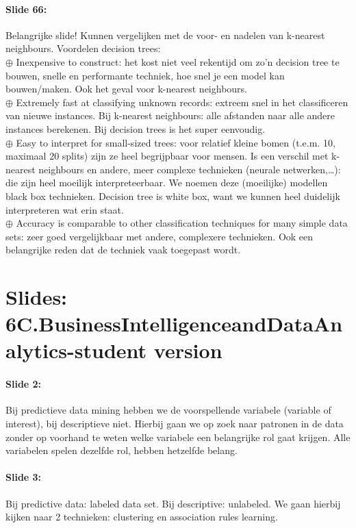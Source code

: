 \documentclass[10pt,a4paper]{report}
\begin{document}
\paragraph{Slide 66:}Belangrijke slide! Kunnen vergelijken met de voor- en nadelen van k-nearest neighbours. Voordelen decision trees:\\
$\oplus$ Inexpensive to construct: het kost niet veel rekentijd om zo'n decision tree te bouwen, snelle en performante techniek, hoe snel je een model kan bouwen/maken. Ook het geval voor k-nearest neighbours.\\
$\oplus$ Extremely fast at classifying unknown records: extreem snel in het classificeren van nieuwe instances. Bij k-nearest neighbours: alle afstanden naar alle andere instances berekenen. Bij decision trees is het super eenvoudig. \\
$\oplus$ Easy to interpret for small-sized trees: voor relatief kleine bomen (t.e.m. 10, maximaal 20 splits) zijn ze heel begrijpbaar voor mensen. Is een verschil met k-nearest neighbours en andere, meer complexe technieken (neurale netwerken,…): die zijn heel moeilijk interpreteerbaar. We noemen deze (moeilijke) modellen black box technieken. Decision tree is white box, want we kunnen heel duidelijk interpreteren wat erin staat.\\
$\oplus$ Accuracy is comparable to other classification techniques for many simple data sets: zeer goed vergelijkbaar met andere, complexere technieken. Ook een belangrijke reden dat de techniek vaak toegepast wordt. 

\section{Slides: 6C.BusinessIntelligenceandDataAnalytics-student version}

\paragraph{Slide 2:}Bij predictieve data mining hebben we de voorspellende variabele (variable of interest), bij descriptieve niet. Hierbij gaan we op zoek naar patronen in de data zonder op voorhand te weten welke variabele een belangrijke rol gaat krijgen. Alle variabelen spelen dezelfde rol, hebben hetzelfde belang.

\paragraph{Slide 3:}Bij predictive data: labeled data set. Bij descriptive: unlabeled. We gaan hierbij kijken naar 2 technieken: clustering en association rules learning.
\end{document}
